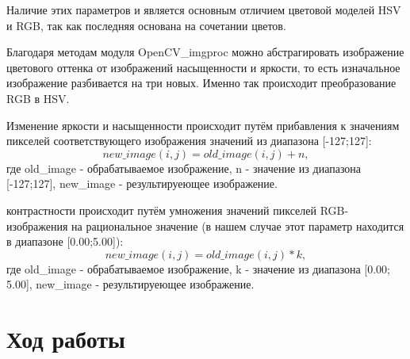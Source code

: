 \documentclass[12pt,a4paper]{scrartcl}
\begin{document}
Наличие этих параметров и является основным отличием цветовой моделей HSV и RGB, так как последняя основана на сочетании цветов.

Благодаря методам модуля OpenCV\_imgproc можно абстрагировать изображение цветового оттенка от изображений насыщенности и яркости, то есть изначальное изображение разбивается на три новых. Именно так происходит преобразование RGB в HSV. 

Изменение яркости и насыщенности происходит путём прибавления к значениям пикселей соответствующего изображения значений из диапазона [-127;127]: \[ new\_image(i,j) = old\_image(i,j) + n, \] где old\_image - обрабатываемое изображение, n - значение из диапазона [-127;127], new\_image - результируеющее изображение.  

 контрастности происходит путём умножения значений пикселей RGB-изображения на рациональное значение (в нашем случае этот параметр находится в диапазоне [0.00;5.00]): \[ new\_image(i,j) = old\_image(i,j) * k, \] где old\_image - обрабатываемое изображение, k - значение из диапазона [0.00; 5.00], new\_image - результируеющее изображение.  


\vfill
\newpage


\section{Ход работы}
\end{document}
